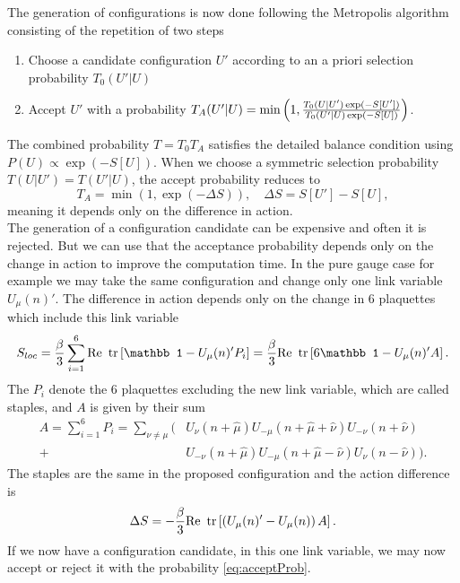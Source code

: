 The generation of configurations is now done following the Metropolis algorithm consisting of the repetition of two steps
\begin{enumerate}
    \item Choose a candidate configuration $U'$ according to an a priori selection probability $T_0(U'|U)$
    \item Accept $U'$ with a probability $T_A(U'|U)=\min\left(1,\frac{T_0(U|U')\exp(-S[U'])}{T_0(U'|U)\exp(-S[U])}\right)$.
\end{enumerate}
The combined probability $T=T_0T_A$ satisfies the detailed balance condition using $P(U)\propto\exp(-S[U])$. When we choose a symmetric selection probability $T(U|U')=T(U'|U)$, the accept probability reduces to
\begin{equation}
    T_A=\min(1,\exp(-\Delta S)),\quad\Delta S=S[U']-S[U],\label{eq:acceptProb}
\end{equation}
meaning it depends only on the difference in action. \\
The generation of a configuration candidate can be expensive and often it is rejected. But we can use that the acceptance probability depends only on the change in action to improve the computation time. In the pure gauge case for example we may take the same configuration and change only one link variable $U_\mu(n)'$. The difference in action depends only on the change in 6 plaquettes which include this link variable 
\begin{equation}
    S_{loc}=\frac{\beta}{3}\sum_{i=1}^6\text{Re }\tr\sqbr{\mathbb1-U_\mu(n)'P_i}=\frac{\beta}{3}\text{Re }\tr\sqbr{6\mathbb1-U_\mu(n)'A}.
\end{equation}
The $P_i$ denote the 6 plaquettes excluding the new link variable, which are called staples, and $A$ is given 
by their sum
\begin{align}
    A=\sum_{i=1}^6P_i=\sum_{\nu\neq\mu}\big(&U_\nu(n+\hat\mu)U_{-\mu}(n+\hat\mu+\hat\nu)U_{-\nu}(n+\hat\nu)\\
    +&U_{-\nu}(n+\hat\mu)U_{-\mu}(n+\hat\mu-\hat\nu)U_{\nu}(n-\hat\nu)\big).
\end{align}
The staples are the same in the proposed configuration and the action difference is
\begin{equation}
    \Delta S=-\frac{\beta}{3}\text{Re }\operatorname{tr}\left[\left(U_\mu(n)'-U_\mu(n)\right)A\right].
\end{equation}
If we now have a configuration candidate, in this one link variable, we may now accept or reject it with the probability \eqref{eq:acceptProb}\cite{gattringer}. \\


